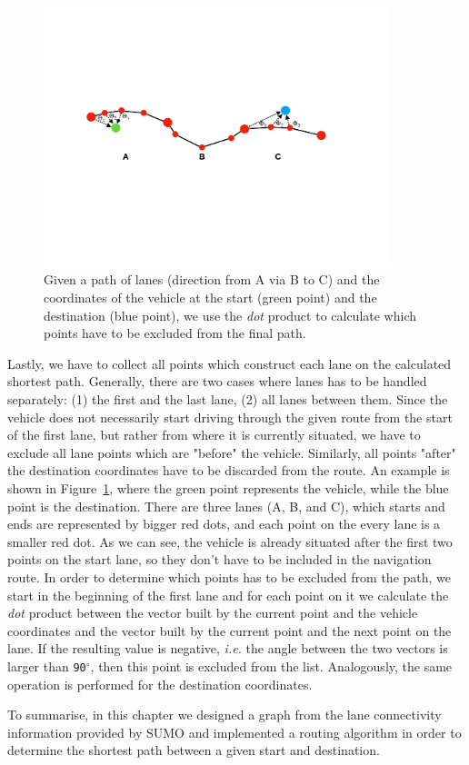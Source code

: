 \begin{figure}[htb]
	\centering
	\includegraphics[width=0.9\textwidth]{figures/navpoints}
	\caption{Given a path of lanes (direction from A via B to C) and the coordinates of the vehicle at the start (green point) and the destination (blue point), we use the \emph{dot} product to calculate which points have to be excluded from the final path.}
	\label{fig:navpoints}
\end{figure}

Lastly, we have to collect all points which construct each lane on the calculated shortest path. Generally, there are two cases where lanes has to be handled separately: (1) the first and the last lane, (2) all lanes between them. Since the vehicle does not necessarily start driving through the given route from the start of the first lane, but rather from where it is currently situated, we have to exclude all lane points which are "before" the vehicle. Similarly, all points "after" the destination coordinates have to be discarded from the route. An example is shown in Figure~\ref{fig:navpoints}, where the green point represents the vehicle, while the blue point is the destination. There are three lanes (A, B, and C), which starts and ends are represented by bigger red dots, and each point on the every lane is a smaller red dot. As we can see, the vehicle is already situated after the first two points on the start lane, so they don't have to be included in the navigation route. In order to determine which points has to be excluded from the path, we start in the beginning of the first lane and for each point on it we calculate the \emph{dot} product between the vector built by the current point and the vehicle coordinates and the vector built by the current point and the next point on the lane. If the resulting value is negative, \emph{i.e.} the angle between the two vectors is larger than \texttt{90$^{\circ}$}, then this point is excluded from the list. Analogously, the same operation is performed for the destination coordinates.

To summarise, in this chapter we designed a graph from the lane connectivity information provided by SUMO and implemented a routing algorithm in order to determine the shortest path between a given start and destination. 
